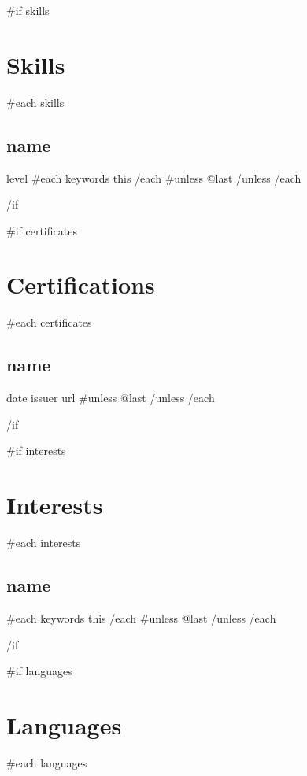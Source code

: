 \documentclass[letterpaper]{article}
\newcommand{\sectionsep}[0]{}
\newcommand{\subsectionsep}[0]{}
\begin{document}
\begin{minipage}[t][5cm][t]{0.25\textwidth} 
\begin{small}
\sectionfont{\normalsize\bfseries\uppercase}
\subsectionfont{\color{accent-600}\normalsize\bfseries}

  {{#if skills}}
  \section*{Skills}{
  {{#each skills}}
    \subsection*{ {{ name }} }{
      {{ level }}\newline
      {{#each keywords}}{{ this }}{{/each}}\newline
    }
    {{#unless @last}} \subsectionsep {{/unless}}
    {{/each}}
  }
  \sectionsep
  {{/if}}

  {{#if certificates}}
  \section*{Certifications}{
    {{#each certificates}}
    \subsection*{ {{ name }} } {
      {{ date }}\newline
      {{ issuer }}\newline
      {{ url }}\newline
    }
    {{#unless @last}} \subsectionsep {{/unless}}
    {{/each}}
  }
  \sectionsep
  {{/if}}

  {{#if interests}}
  \section*{Interests} {
    {{#each interests}}
    \subsection*{ {{ name }} } {
      {{#each keywords}}
        {{ this }} 
      {{/each}}\newline
    }
    {{#unless @last}} \subsectionsep {{/unless}}
    {{/each}}
  }
  \sectionsep
  {{/if}}

  {{#if languages}}
  \section*{Languages} {
    {{#each languages}}
}
\end{small}
\end{minipage}
\end{document}
